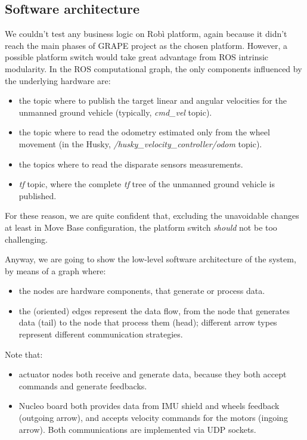 \subsection{Software architecture}\label{subsec:robiSoftware}
We couldn't test any business logic on Robì platform, again because it didn't reach the main phases of \ac{GRAPE} project as the chosen platform. However, a possible platform switch would take great advantage from \ac{ROS} intrinsic modularity. In the \ac{ROS} computational graph, the only components influenced by the underlying hardware are:
\begin{itemize}
	\item the topic where to publish the target linear and angular velocities for the unmanned ground vehicle (typically, \textit{cmd\_vel} topic).
	\item the topic where to read the odometry estimated only from the wheel movement (in the Husky, \textit{/husky\_velocity\_controller/odom} topic).
	\item the topics where to read the disparate sensors measurements.
	\item \textit{tf} topic, where the complete \textit{tf} tree of the unmanned ground vehicle is published.
\end{itemize}
For these reason, we are quite confident that, excluding the unavoidable changes at least in Move Base configuration, the platform switch \textit{should} not be too challenging.

\par Anyway, we are going to show the low-level software architecture of the system, by means of a graph where:
\begin{itemize}
	\item the nodes are hardware components, that generate or process data.
	\item the (oriented) edges represent the data flow, from the node that generates data (tail) to the node that process them (head); different arrow types represent different communication strategies.
\end{itemize}
Note that:
\begin{itemize}
	\item  actuator nodes both receive and generate data, because they both accept commands and generate feedbacks.
	\item Nucleo board both provides data from \ac{IMU} shield and wheels feedback (outgoing arrow), and accepts velocity commands for the motors (ingoing arrow). Both communications are implemented via UDP sockets. 
	\par 
\end{itemize}


